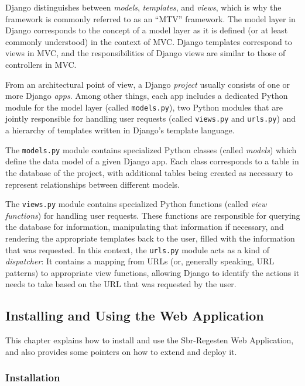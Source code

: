 Django distinguishes between \emph{models}, \emph{templates}, and
\emph{views}, which is why the framework is commonly referred to as an
``MTV'' framework. The model layer in Django corresponds to the
concept of a model layer as it is defined (or at least commonly
understood) in the context of MVC. Django templates correspond to
views in MVC, and the responsibilities of Django views are similar to
those of controllers in MVC.

From an architectural point of view, a Django \emph{project} usually
consists of one or more Django \emph{apps}. Among other things, each
app includes a dedicated Python module for the model layer (called
\texttt{models.py}), two Python modules that are jointly responsible for
handling user requests (called \texttt{views.py} and \texttt{urls.py})
and a hierarchy of templates written in Django's template language.

The \texttt{models.py} module contains specialized Python classes
(called \emph{models}) which define the data model of a given Django
app. Each class corresponds to a table in the database of the project,
with additional tables being created as necessary to represent
relationships between different models.

The \texttt{views.py} module contains specialized Python functions
(called \emph{view functions}) for handling user requests. These
functions are responsible for querying the database for information,
manipulating that information if necessary, and rendering the
appropriate templates back to the user, filled with the information
that was requested. In this context, the \texttt{urls.py} module acts
as a kind of \emph{dispatcher}: It contains a mapping from URLs (or,
generally speaking, URL patterns) to appropriate view functions,
allowing Django to identify the actions it needs to take based on the
URL that was requested by the user.

\subsection{Installing and Using the Web Application}
\label{sec:webapp}

This chapter explains how to install and use the Sbr-Regesten Web
Application, and also provides some pointers on how to extend and
deploy it.

\subsubsection{Installation}
\label{sec:install}

